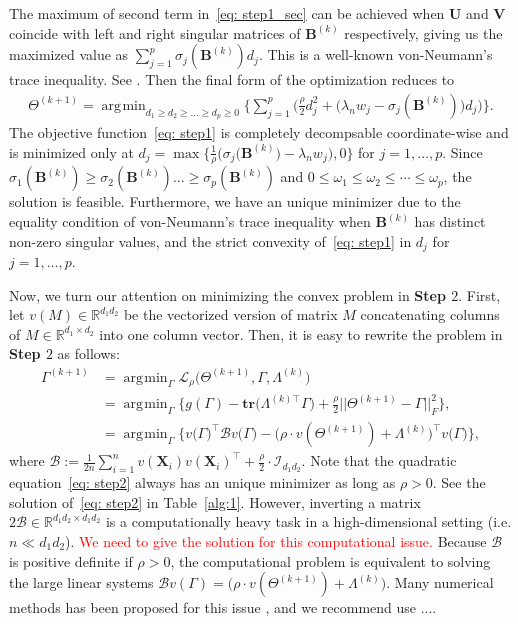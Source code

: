 \documentclass[12pt]{article}
\DeclareMathOperator*{\argmin}{\arg\!\min}
\begin{document}
The maximum of second term in~\eqref{eq: step1_sec} can be achieved when $\mathbf{U}$ and $\mathbf{V}$ coincide with 
left and right singular matrices of $\mathbf{B}^{(k)}$ respectively, giving us the maximized value as $\sum_{j=1}^{p}\sigma_{j}(\mathbf{B}^{(k)})d_{j}$.
This is a well-known von-Neumann's trace inequality.
See \cite{von1937some,mirsky1975trace}. 
Then the final form of the optimization reduces to
\begin{align}
     \Theta^{(k+1)} = \argmin_{d_{1}\geq d_{2}\geq \dots \geq d_{p} \geq 0 }\bigg\{ \sum_{j=1}^{p} \bigg( \frac{\rho}{2} d_{j}^{2} + \big( \lambda_{n}w_{j}-\sigma_{j}(\mathbf{B}^{(k)}) \big) d_{j} \bigg)  \bigg\}. \label{eq: step1}
\end{align}
The objective function~\eqref{eq: step1} is completely decompsable coordinate-wise and is minimized only at $d_{j}=\max\big\{\frac{1}{\rho}\big(\sigma_{j}(\mathbf{B}^{(k)}\big)-\lambda_{n} w_{j}\big),0 \big\}$ for $j=1,\dots,p$.
Since $\sigma_{1}(\mathbf{B}^{(k)})\geq\sigma_{2}(\mathbf{B}^{(k)})\dots\geq\sigma_{p}(\mathbf{B}^{(k)})$ and $0\leq\omega_{1}\leq\omega_{2}\leq\cdots\leq\omega_{p}$, the solution is feasible.
Furthermore, we have an unique minimizer due to the equality condition of von-Neumann's trace inequality when $\mathbf{B}^{(k)}$ has distinct non-zero singular values, and the strict convexity of~\eqref{eq: step1} in $d_{j}$ for $j=1,\dots,p$.

Now, we turn our attention on minimizing the convex problem in \textbf{Step $2$}.
First, let $v(M)\in\mathbb{R}^{d_{1}d_{2}}$ be the vectorized version of matrix $M$ concatenating columns of $M\in\mathbb{R}^{d_{1} \times d_{2}}$ into one column vector. 
Then, it is easy to rewrite the problem in \textbf{Step $2$} as follows: 
\begin{align}
    \Gamma^{(k+1)} 
    &= \argmin_{\Gamma} \mathcal{L}_{\rho} \big( \Theta^{(k+1)},\Gamma,\Lambda^{(k)} \big) \nonumber \\
    &= \argmin_{\Gamma} \bigg\{ g(\Gamma) - \textbf{tr}\big( \Lambda^{(k)\top}\Gamma\big) + \frac{\rho}{2} || \Theta^{(k+1)}-\Gamma ||_{F}^{2} \bigg\}, \\
    &= \argmin_{\Gamma} \bigg\{v\big(\Gamma\big)^{\top}\mathcal{B} v\big(\Gamma\big) - \big( \rho \cdot v(\Theta^{(k+1)})+\Lambda^{(k)} \big)^{\top}v\big(\Gamma\big) \bigg\}, \label{eq: step2}
\end{align}
where $\mathcal{B}:=\frac{1}{2n}\sum_{i=1}^{n} v(\mathbf{X}_{i})v(\mathbf{X}_{i})^{\top}+\frac{\rho}{2}\cdot\mathcal{I}_{d_1d_2}$. 
Note that the quadratic equation~\eqref{eq: step2} always has an unique minimizer as long as $\rho>0$.
See the solution of~\eqref{eq: step2} in Table~\ref{alg:1}.
However, inverting a matrix $2\mathcal{B}\in\mathbb{R}^{d_{1}d_{2}\times d_{1}d_{2}}$ is a computationally heavy task in a high-dimensional setting (i.e. $n \ll d_{1}d_{2}$).
\textcolor{red}{We need to give the solution for this computational issue.} 
{\color{blue} Because $\mathcal{B}$ is positive definite if $\rho > 0$, the computational problem is equivalent to solving the large linear systems  $\mathcal{B}v(\Gamma) = \big( \rho \cdot v(\Theta^{(k+1)})+\Lambda^{(k)} \big).$ Many numerical methods has been proposed for this issue \citep{young2014iterative}, and we recommend use ....}
\end{document}

